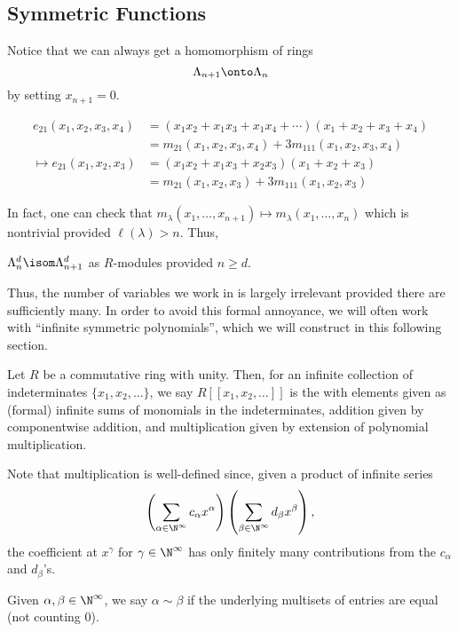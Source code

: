 \documentclass[11pt,leqno,oneside]{amsart}
\numberwithin{thm}{section}
\newcommand{\sym}{\Lambda}
\begin{document}
\subsection{Symmetric Functions}
Notice that we can always get a homomorphism of rings \[
  \sym_{n+1} \onto \sym_n
\]
by setting \(x_{n+1} = 0\). 
\begin{example}
  \begin{align*}
    e_{21}(x_1, x_2, x_3, x_4)
    & = (x_1 x_2 + x_1 x_3 + x_1 x_4 + \cdots)(x_1+x_2+x_3+x_4) \\
    & = m_{21}(x_1, x_2, x_3, x_4) + 3 m_{111}(x_1, x_2, x_3, x_4) \\
    \mapsto e_{21}(x_1, x_2, x_3)
    & = (x_1 x_2 + x_1 x_3 + x_2 x_3)(x_1+x_2+x_3)\\
    & = m_{21}(x_1, x_2, x_3) + 3 m_{111}(x_1, x_2, x_3)
  \end{align*}
\end{example}
In fact, one can check that \(m_\lambda(x_1, \ldots, x_{n+1}) \mapsto
m_{\lambda}(x_1, \ldots, x_n)\) which is nontrivial provided
\(\ell(\lambda) > n\). Thus,
\begin{prop}
  \(\sym_n^d \isom \sym_{n+1}^d\) as \(R\)-modules provided \(n \geq d\).
\end{prop}
Thus, the number of variables we work in is largely irrelevant
provided there are sufficiently many. In order to avoid this formal
annoyance, we will often work with ``infinite symmetric polynomials'',
which we will construct in this following section.
\begin{defn}
  Let \(R\) be a commutative ring with unity. Then, for an infinite
  collection of indeterminates
  \(\{x_1, x_2, \ldots\}\), we say
  \(R[[x_1,x_2,\ldots]]\) is the 
  with elements given as (formal) infinite sums of monomials in the
  indeterminates, addition given by componentwise addition, and
  multiplication given by extension of polynomial multiplication.
\end{defn}
Note that multiplication is well-defined since, given a product of
infinite series \[
\left( \sum_{\alpha \in \N^\infty} c_\alpha x^\alpha
\right)\left( \sum_{\beta \in \N^\infty}
  d_\beta x^\beta \right),
\] the coefficient at \(x^\gamma\)  for \(\gamma \in \N^\infty\) has only
finitely many contributions from the \(c_\alpha\) and \(d_\beta\)'s.
\begin{defn}
  Given \(\alpha, \beta \in \N^\infty\), we say \(\alpha \sim \beta\)
  if the underlying multisets of entries are equal (not counting \(0\)).
\end{defn}
\end{document}
